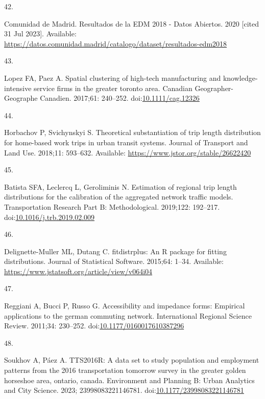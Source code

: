 \documentclass[10pt,letterpaper]{article}
\newlength{\cslhangindent}
\newlength{\csllabelwidth}
\newlength{\cslentryspacingunit} %
\newenvironment{CSLReferences}[2] %
 {%
  \setlength{\parindent}{0pt}
  \ifodd #1
  \let\oldpar\par
  \def\par{\hangindent=\cslhangindent\oldpar}
  \fi
  \setlength{\parskip}{#2\cslentryspacingunit}
 }%
 {}
\newcommand{\CSLLeftMargin}[1]{\parbox[t]{\csllabelwidth}{#1}}
\newcommand{\CSLRightInline}[1]{\parbox[t]{\linewidth - \csllabelwidth}{#1}\break}
\begin{document}
\begin{CSLReferences}{0}{0}
\leavevmode{}%
\CSLLeftMargin{42. }%
\CSLRightInline{Comunidad de Madrid. Resultados de la {EDM} 2018 - Datos
Abiertos. 2020 {[}cited 31 Jul 2023{]}. Available:
\url{https://datos.comunidad.madrid/catalogo/dataset/resultados-edm2018}}

\leavevmode{}%
\CSLLeftMargin{43. }%
\CSLRightInline{Lopez FA, Paez A. Spatial clustering of high-tech
manufacturing and knowledge-intensive service firms in the greater
toronto area. Canadian Geographer-Geographe Canadien. 2017;61: 240--252.
doi:\href{https://doi.org/10.1111/cag.12326}{10.1111/cag.12326}}

\leavevmode{}%
\CSLLeftMargin{44. }%
\CSLRightInline{Horbachov P, Svichynskyi S. Theoretical substantiation
of trip length distribution for home-based work trips in urban transit
systems. Journal of Transport and Land Use. 2018;11: 593--632.
Available: \url{https://www.jstor.org/stable/26622420}}

\leavevmode{}%
\CSLLeftMargin{45. }%
\CSLRightInline{Batista SFA, Leclercq L, Geroliminis N. Estimation of
regional trip length distributions for the calibration of the aggregated
network traffic models. Transportation Research Part B: Methodological.
2019;122: 192--217.
doi:\href{https://doi.org/10.1016/j.trb.2019.02.009}{10.1016/j.trb.2019.02.009}}

\leavevmode{}%
\CSLLeftMargin{46. }%
\CSLRightInline{Delignette-Muller ML, Dutang C. {fitdistrplus}: An {R}
package for fitting distributions. Journal of Statistical Software.
2015;64: 1--34. Available:
\url{https://www.jstatsoft.org/article/view/v064i04}}

\leavevmode{}%
\CSLLeftMargin{47. }%
\CSLRightInline{Reggiani A, Bucci P, Russo G. Accessibility and
impedance forms: Empirical applications to the german commuting network.
International Regional Science Review. 2011;34: 230--252.
doi:\href{https://doi.org/10.1177/0160017610387296}{10.1177/0160017610387296}}

\leavevmode{}%
\CSLLeftMargin{48. }%
\CSLRightInline{Soukhov A, Páez A. {TTS}2016R: A data set to study
population and employment patterns from the 2016 transportation tomorrow
survey in the greater golden horseshoe area, ontario, canada.
Environment and Planning B: Urban Analytics and City Science. 2023;
23998083221146781.
doi:\href{https://doi.org/10.1177/23998083221146781}{10.1177/23998083221146781}}


\end{CSLReferences}
\end{document}
